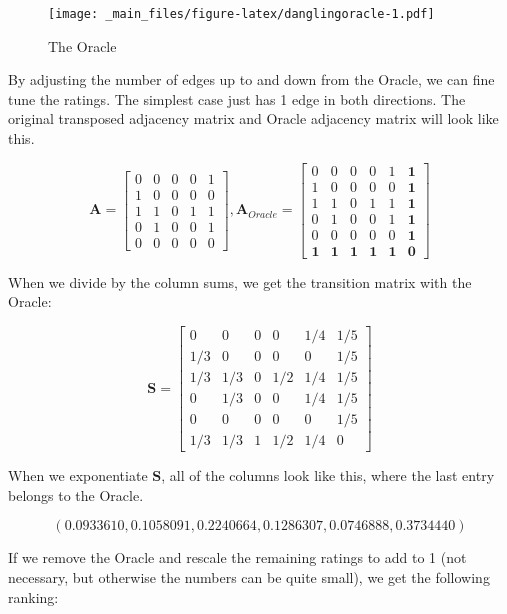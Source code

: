 \documentclass[
]{book}
\theoremstyle{definition}
\theoremstyle{definition}
\theoremstyle{definition}
\theoremstyle{definition}
\theoremstyle{remark}
\begin{document}
\begin{figure}
\centering
\texttt{[image: \_main\_files/figure-latex/danglingoracle-1.pdf]}
\caption{\label{fig:danglingoracle}The Oracle}
\end{figure}

By adjusting the number of edges up to and down from the Oracle, we can fine tune the ratings. The simplest case just has 1 edge in both directions. The original transposed adjacency matrix and Oracle adjacency matrix will look like this.

\[\mathbf{A}=\begin{bmatrix} 0 & 0 & 0 & 0 & 1 \\ 
   1 & 0 & 0 & 0 & 0 \\ 
   1 & 1 & 0 & 1 & 1 \\ 
   0 & 1 & 0 & 0 & 1 \\ 
   0 & 0 & 0 & 0 & 0 \end{bmatrix},\mathbf{A}_{Oracle}=\begin{bmatrix} 0 & 0 & 0 & 0 & 1 & \mathbf{1} \\ 
   1 & 0 & 0 & 0 & 0 & \mathbf{1} \\ 
   1 & 1 & 0 & 1 & 1 & \mathbf{1} \\ 
   0 & 1 & 0 & 0 & 1 & \mathbf{1} \\ 
   0 & 0 & 0 & 0 & 0 & \mathbf{1} \\ 
   \mathbf{1} & \mathbf{1} & \mathbf{1} & \mathbf{1} & \mathbf{1} & \mathbf{0}\end{bmatrix}\]

When we divide by the column sums, we get the transition matrix with the Oracle:

\[\mathbf{S=}\begin{bmatrix} 0 & 0 & 0 & 0 & 1/4 & 1/5 \\ 1/3 & 0 & 0 & 0 & 0 & 1/5\\
  1/3 & 1/3 & 0 & 1/2 & 1/4 & 1/5 \\ 
   0 & 1/3 & 0 & 0 & 1/4 & 1/5 \\ 
   0 & 0 & 0 & 0 & 0 & 1/5 \\ 
  1/3 & 1/3 & 1 & 1/2 & 1/4 & 0\end{bmatrix}\]

When we exponentiate \(\mathbf{S}\), all of the columns look like this, where the last entry belongs to the Oracle.

\[(0.0933610, 0.1058091, 0.2240664, 0.1286307, 0.0746888, 0.3734440)\]

If we remove the Oracle and rescale the remaining ratings to add to 1 (not necessary, but otherwise the numbers can be quite small), we get the following ranking:
\end{document}
